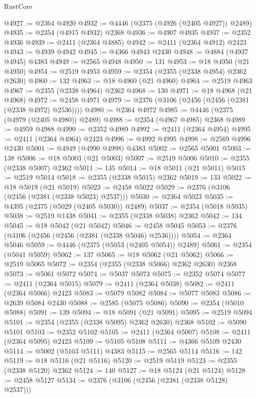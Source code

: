 \begin{lexlean}{RustCore}
\begin{coremodule}
@4927 := @2364 @4920
@4932 := @4446 (@2375 (@4926 (@2405 @4927)) @2489)
@4935 := @2354 (@4915 @4932) @2368
@4936 := @4907 @4935
@4937 := @2352 @4936
@4939 := @2411 (@2364 @4885)
@4942 := @2411 (@2364 @4912) @2423
@4943 := @4939 @4942
@4945 := @4366 @4943 @2430
@4948 := @4884 (@4937 @4945) @4383
@4949 := @2565 @4948
@4950 := 131
@4953 := @18 @4950 (@21 @4950)
@4954 := @2519 @4953
@4959 := @2354 (@2355 (@2338 @4954) @2362 @2630)
@4960 := 132
@4963 := @18 @4960 (@21 @4960)
@4964 := @2519 @4963
@4967 := @2355 (@2338 @4964) @2362
@4968 := 130
@4971 := @18 @4968 (@21 @4968)
@4972 := @2458 @4971
@4979 := @2376 (@3106 (@2456 (@2456 (@2381 (@2338 @4972) @2536))))
@4980 := @2364 @4972
@4985 := @4446 (@2375 (@4979 (@2405 @4980)) @2489)
@4988 := @2354 (@4967 @4985) @2368
@4989 := @4959 @4988
@4990 := @2352 @4989
@4992 := @2411 (@2364 @4954)
@4995 := @2411 (@2364 @4964) @2423
@4996 := @4992 @4995
@4998 := @2569 @4996 @2430
@5001 := @4949 (@4990 @4998) @4383
@5002 := @2565 @5001
@5003 := 138
@5006 := @18 @5003 (@21 @5003)
@5007 := @2519 @5006
@5010 := @2355 (@2338 @5007) @2362
@5011 := 135
@5014 := @18 @5011 (@21 @5011)
@5015 := @2519 @5014
@5018 := @2355 (@2338 @5015) @2362
@5019 := 133
@5022 := @18 @5019 (@21 @5019)
@5023 := @2458 @5022
@5029 := @2376 (@3106 (@2456 (@2381 (@2338 @5023) @2537)))
@5030 := @2364 @5023
@5035 := @4395 (@2375 (@5029 (@2405 @5030)) @2489)
@5037 := @2354 (@5018 @5035)
@5038 := @2519 @1438
@5041 := @2355 (@2338 @5038) @2362
@5042 := 134
@5045 := @18 @5042 (@21 @5042)
@5046 := @2458 @5045
@5053 := @2376 (@3106 (@2456 (@2456 (@2381 (@2338 @5046) @2536))))
@5054 := @2364 @5046
@5059 := @4446 (@2375 (@5053 (@2405 @5054)) @2489)
@5061 := @2354 (@5041 @5059)
@5062 := 137
@5065 := @18 @5062 (@21 @5062)
@5066 := @2519 @5065
@5072 := @2354 (@2355 (@2338 @5066) @2362 @2630) @2368
@5073 := @5061 @5072
@5074 := @5037 @5073
@5075 := @2352 @5074
@5077 := @2411 (@2364 @5015)
@5079 := @2411 (@2364 @5038)
@5082 := @2411 (@2364 @5066) @2423
@5083 := @5079 @5082
@5084 := @5077 @5083
@5086 := @2639 @5084 @2430
@5088 := @2585 (@5075 @5086)
@5090 := @2354 (@5010 @5088)
@5091 := 139
@5094 := @18 @5091 (@21 @5091)
@5095 := @2519 @5094
@5101 := @2354 (@2355 (@2338 @5095) @2362 @2630) @2368
@5102 := @5090 @5101
@5103 := @2352 @5102
@5105 := @2411 (@2364 @5007)
@5108 := @2411 (@2364 @5095) @2423
@5109 := @5105 @5108
@5111 := @4366 @5109 @2430
@5114 := @5002 (@5103 @5111) @4383
@5115 := @2565 @5114
@5116 := 142
@5119 := @18 @5116 (@21 @5116)
@5120 := @2519 @5119
@5123 := @2355 (@2338 @5120) @2362
@5124 := 140
@5127 := @18 @5124 (@21 @5124)
@5128 := @2458 @5127
@5134 := @2376 (@3106 (@2456 (@2381 (@2338 @5128) @2537)))

\end{coremodule}
\end{lexlean}
